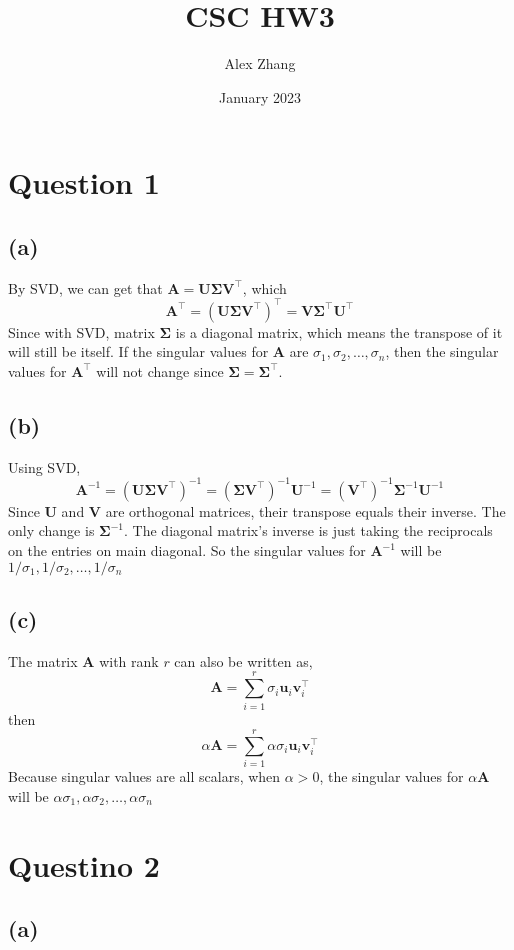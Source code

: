 \documentclass{article}
\title{CSC HW3}
\author{Alex Zhang}
\date{January 2023}
\newcommand{\mat}[1]{\mathbf{#1}}
\begin{document}
\maketitle
\section*{Question 1}

\subsection*{(a)}
By SVD, we can get that $\mat{A} = \mat{U}\mat{\Sigma}\mat{V}^\top$, which
$$\mat{A}^\top =  (\mat{U}\mat{\Sigma}\mat{V}^\top)^\top = \mat{V}\mat{\Sigma}^\top \mat{U}^\top $$
Since with SVD, matrix $\mat{\Sigma}$ is a diagonal matrix, which means the transpose of it will still be itself.
If the singular values for $\mat{A}$ are $\sigma_1, \sigma_2, \dots, \sigma_n$, then the singular values for $\mat{A}^\top$
will not change since $\mat{\Sigma} = \mat{\Sigma}^\top$.
\subsection*{(b)}
Using SVD,
$$\mat{A}^{-1} = (\mat{U}\mat{\Sigma}\mat{V}^\top)^{-1} = (\mat{\Sigma}\mat{V}^\top)^{-1}\mat{U}^{-1} = (\mat{V}^\top)^{-1}\mat{\Sigma}^{-1}\mat{U}^{-1}$$
Since $\mat{U}$ and $\mat{V}$ are orthogonal matrices, their transpose equals their inverse. The only change is $\mat{\Sigma}^{-1}$. The diagonal matrix's inverse
is just taking the reciprocals on the entries on main diagonal. So the singular values for $\mat{A}^{-1}$ will be $1/\sigma_1, 1/\sigma_2, \dots, 1/\sigma_n$
\subsection*{(c)}
The matrix $\mat{A}$ with rank $r$ can also be written as,
$$\mat{A} = \sum^r_{i=1}\sigma_i\mat{u}_i\mat{v}^\top_i$$
then $$\alpha\mat{A} = \sum^r_{i=1}\alpha\sigma_i\mat{u}_i\mat{v}^\top_i$$
Because singular values are all scalars, when $\alpha > 0$, the singular values for $\alpha \mat{A}$ will be $\alpha\sigma_1, \alpha \sigma_2, \dots, \alpha \sigma_n$


\section*{Questino 2}
\subsection*{(a)}
\end{document}
